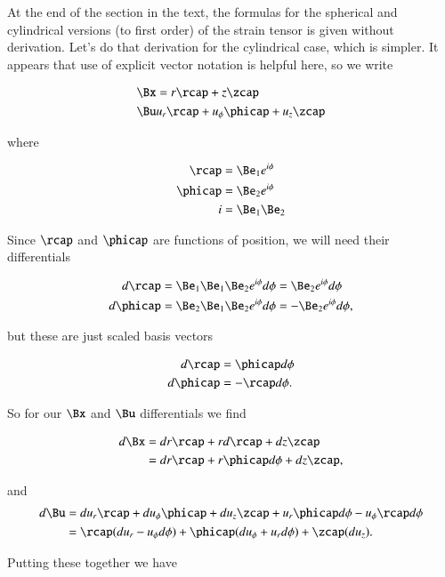 At the end of the section in the text, the formulas for the spherical and cylindrical versions (to first order) of the strain tensor is given without derivation.  Let's do that derivation for the cylindrical case, which is simpler.  It appears that use of explicit vector notation is helpful here, so we write

\begin{align}\label{eqn:continuumL2:n}
\Bx &= r \rcap + z \zcap \\
\Bu & u_r \rcap + u_\phi \phicap + u_z \zcap
\end{align}

where

\begin{align}\label{eqn:continuumL2:n}
\rcap &= \Be_1 e^{i\phi} \\
\phicap &= \Be_2 e^{i\phi} \\
i &= \Be_1 \Be_2
\end{align}

Since $\rcap$ and $\phicap$ are functions of position, we will need their differentials

\begin{align}\label{eqn:continuumL2:n}
d\rcap &= \Be_1 \Be_1 \Be_2 e^{i\phi} d\phi = \Be_2 e^{i \phi} d\phi \\
d\phicap &= \Be_2 \Be_1 \Be_2 e^{i\phi} d\phi = -\Be_2 e^{i \phi} d\phi,
\end{align}

but these are just scaled basis vectors

\begin{align}\label{eqn:continuumL2:n}
d\rcap &= \phicap d\phi \\
d\phicap &= -\rcap d\phi.
\end{align}

So for our $\Bx$ and $\Bu$ differentials we find

\begin{align*}
d\Bx 
&= dr \rcap + r d\rcap + dz \zcap \\
&= dr \rcap + r \phicap d\phi + dz \zcap,
\end{align*}

and
\begin{align*}
d\Bu 
&= du_r \rcap + du_\phi \phicap + du_z \zcap 
+ u_r \phicap d\phi - u_\phi \rcap d\phi \\
&= \rcap( du_r - u_\phi d\phi )
+ \phicap ( du_\phi + u_r d\phi )
+ \zcap ( du_z ).
\end{align*}

Putting these together we have

